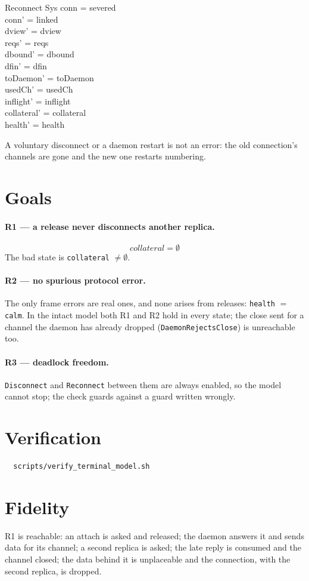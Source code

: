 \documentclass[a4paper,10pt,fleqn]{article}
\begin{document}
\begin{schema}{Reconnect}
  \Delta Sys
\where
  conn = severed \\
  conn' = linked \\
  dview' = dview \\
  reqs' = reqs \\
  dbound' = dbound \\
  dfin' = dfin \\
  toDaemon' = toDaemon \\
  usedCh' = usedCh \\
  inflight' = inflight \\
  collateral' = collateral \\
  health' = health
\end{schema}

A voluntary disconnect or a daemon restart is not an error: the old
connection's channels are gone and the new one restarts numbering.

\section{Goals}

\paragraph{R1 --- a release never disconnects another replica.}
\[
  collateral = \emptyset
\]
The bad state is \texttt{collateral} $\neq \emptyset$.

\paragraph{R2 --- no spurious protocol error.}
The only frame errors are real ones, and none arises from releases:
\texttt{health} $= $ \texttt{calm}.  In the intact model both R1 and R2
hold in every state; the close sent for a channel the daemon has already
dropped (\texttt{DaemonRejectsClose}) is unreachable too.

\paragraph{R3 --- deadlock freedom.}
\texttt{Disconnect} and \texttt{Reconnect} between them are always enabled, so
the model cannot stop; the check guards against a guard written wrongly.

\section{Verification}

\begin{verbatim}
  scripts/verify_terminal_model.sh
\end{verbatim}

\section{Fidelity}

R1 is reachable: an attach is asked and released; the daemon answers it and sends data for its channel; a second replica is asked; the late reply is consumed and the channel closed; the data behind it is unplaceable and the connection, with the second replica, is dropped.
\end{document}
